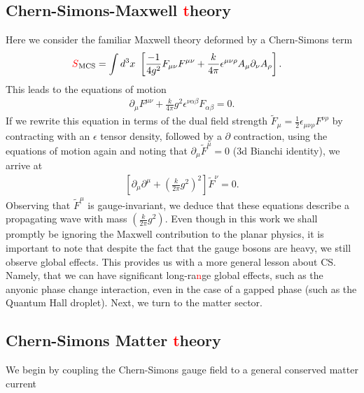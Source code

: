     \subsection{Chern-Simons-Maxwell \textcolor{red}{t}heory}
    Here we consider the familiar Maxwell theory deformed by a Chern-Simons term
    \begin{align}
        \textcolor{red}{S}_{\text{MCS}} &= \int d^3x \ \left[ \frac{-1}{4 g^2} F_{\mu \nu} F^{\mu \nu} + \frac{k}{4 \pi} \epsilon^{\mu \nu \rho} A_{\mu} \partial_{\nu} A_{\rho} \right].
    \end{align}
    This leads to the equations of motion
    \begin{align}
        \partial_{\mu} F^{\mu \nu} + \frac{k}{4\pi} g^2 \epsilon^{\nu \alpha \beta}F_{\alpha \beta} =0.
    \end{align}
    If we rewrite this equation in terms of the dual field strength $\tilde{F}_{\mu} = \frac{1}{2} \epsilon_{\mu\nu\rho} F^{\nu\rho}$ by contracting with an $\epsilon$ tensor density, followed by a $\partial$ contraction, using the equations of motion again and noting that $\partial_{\mu} \tilde{F}^{\mu} =0$ (3d Bianchi identity), we arrive at 
    \begin{align}
        \left[\partial_{\mu} \partial^{\mu} + \left(\frac{k}{2 \pi} g^2 \right)^2 \right] \tilde{F}^{\nu}=0.
    \end{align}
    Observing that $\tilde{F}^{\mu}$ is gauge-invariant, we deduce that these equations describe a propagating wave with mass $\left(\frac{k}{2 \pi} g^2 \right)$.
    Even though in this work we shall promptly be ignoring the Maxwell contribution to the planar physics, it is important to note that despite the fact that the gauge bosons are heavy, we still observe global effects. This provides us with a more general lesson about CS. Namely, that we can have significant long-ra\textcolor{red}{n}ge global effects, such as the anyonic phase change interaction, even in the case of a gapped phase (such as the Quantum Hall droplet).
    Next, we turn to the matter sector.
    \subsection{Chern-Simons Matter \textcolor{red}{t}heory}
    
    We begin by coupling the Chern-Simons gauge field to a general conserved matter current


